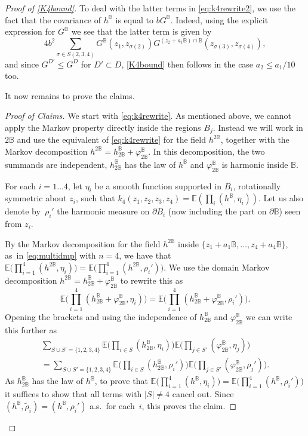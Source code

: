 \documentclass[10pt]{amsart}
\let\ts\textstyle
\theoremstyle{definition}
\newcommand{\E}{\mathbb{E}}
\newcommand{\B}{\mathbb{B}}\let\D\B\let\Ub\B
\begin{document}
\begin{proof}[Proof of \eqref{K4bound}]
To deal with the latter terms in \eqref{eq:k4rewrite2}, we use the fact that the covariance of $h^\B$ is equal to $bG^\B$. Indeed, using the explicit expression for $G^\B$ we see that the latter term is given
by\vspace*{-3pt}
\[
4b^2\sum_{\sigma\in S({2,3,4})}G^\B(z_1,z_{\sigma(2)})G^{(z_2+a_1\B)\cap \B}(z_{\sigma(3)},z_{\sigma(4)}),
\]
and since $G^{D'}\le G^D$ for $D'\subset D$, \eqref{K4bound} then follows in the case $a_2 \leq a_1/10$ too. \medskip

{It now remains to prove the claims.}

\begin{proof}[Proof of Claims]
We start with \eqref{eq:k4rewrite}. As mentioned above, we cannot apply the Markov property directly inside the regions $B_j$. Instead we will work in $2\B$ and use the equivalent of \eqref{eq:k4rewrite} for the field $h^{2\B}$, together with the Markov decomposition $h^{2\B}=h^\B_{2\B}+\varphi^\B_{2\B}$. In this decomposition, the two summands are independent, $h^{\B}_{2\B}$ has the law of $h^\B$ and $\varphi_{2\B}^\B$ is harmonic inside $\B$.

For each $i = 1 \dots 4$, let $\eta_i$ be a smooth function supported in $B_i$, rotationally symmetric about $z_i$, such that $k_4(z_1,z_2,z_3,z_4)=\E(\prod_i (h^\B,\eta_i))$. Let us also denote by~$\rho_i'$ the harmonic measure on $\partial B_i$ (now including the part on $\partial \B$) seen from $z_i$.

By the Markov decomposition for the field $h^{2\B}$ inside $\{z_1+a_1\B,\dots, z_4+a_4\B\}$, as~in \eqref{eq:multidmp} with $n=4$, we have that {$\E\bigl(\prod_{i=1}^4 (h^{2\B},\eta_i)\bigr) = \E\bigl(\prod_{i=1}^4 (h^{2\B},\rho_i')\bigr)$.} We use the domain Markov decomposition $h^{2\B}=h^\B_{2\B}+\varphi^\B_{2\B}$ to rewrite this as
\[\ts
\E\bigl(\prod_{i=1}^4 (h^\B_{2\B}+\varphi^\B_{2\B},\eta_i)\bigr) = \E\bigl(\prod_{i=1}^4 (h^\B_{2\B}+\varphi^\B_{2\B},\rho_i') \bigr).
\]
Opening the brackets and using the independence of $h^\B_{2\B}$ and $\varphi^\B_{2\B}$ we can write this further as
\begin{multline*}
\sum_{S \cup S' = \{1,2,3,4\}} \ts\E\bigl(\prod_{i\in S} (h^\B_{2\B},\eta_i)\bigr)\E\bigl(\prod_{j\in S'} (\varphi^\B_{2\B},\eta_j)\bigr)\\
= \sum_{S \cup S' = \{1,2,3,4\}} \ts\E\bigl(\prod_{i\in S} (h^\B_{2\B},\rho_i')\bigr)\E\bigl(\prod_{j\in S'} (\varphi^\B_{2\B},\rho_j')\bigr).
\end{multline*}
As $h^{\B}_{2\B}$ has the law of $h^\B$, to prove that $\E\bigl(\prod_{i=1}^4 (h^{\B},\eta_i)\bigr) = \E\bigl(\prod_{i=1}^4 (h^{\B},\rho_i')\bigr)$ it suffices to show that all terms with $|S| \neq 4$ cancel out. Since $(h^\B,\tilde{\rho}_i)=(h^\B,\rho_i')$ a.s.\ for each~$i$, this proves the claim.


\end{proof}
\end{proof}
\end{document}
